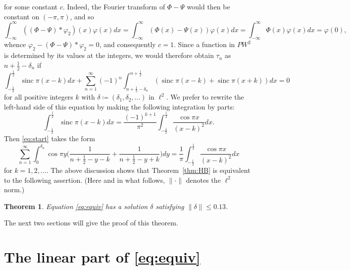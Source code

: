 \documentclass[12pt]{amsart}
\theoremstyle{plain}
\newtheorem{theorem}{Theorem}
\DeclareMathOperator{\sinc}{sinc}
\begin{document}
for some constant $c$. Indeed, the Fourier transform of $\Phi-\Psi$ would then be constant on $(-\pi,\pi)$, and so
\[ \int_{-\infty}^\infty ((\Phi-\Psi)\ast \varphi_2)(x)\varphi(x) dx=\int_{-\infty}^\infty (\Phi(x)-\Psi(x))\varphi(x) dx = \int_{-\infty}^\infty \Phi(x)\varphi(x) dx=\varphi(0),\] 
whence $\varphi_2 - (\Phi-\Psi)\ast \varphi_2=0$, and consequently $c=1$.
Since a function in $PW^2$ is determined by its values at the integers, we would therefore obtain $\tau_n$ as $n+\frac12-\delta_n$ if 
\begin{equation} \label{eq:start}  \int_{-\frac{1}{2}}^{\frac{1}{2}} \sinc \pi(x-k) dx + \sum_{n=1}^{\infty} (-1)^n \int_{n+\frac12-\delta_n}^{n+\frac{1}{2}} \left( \sinc \pi (x-k) + \sinc \pi (x+k)\right) dx=0 \end{equation}
for all positive integers $k$ with $\delta\coloneqq (\delta_1, \delta_2, \ldots )$ in $\ell^2$. We prefer to rewrite the left-hand side of this equation by 
making the following integration by parts:
\[ \int_{-\frac{1}{2}}^{\frac{1}{2}} \sinc \pi(x-k) dx = \frac{(-1)^{k+1}}{\pi^2} \int_{-\frac{1}{2}}^{\frac{1}{2}} \frac{\cos \pi x}{(x-k)^2} dx .\]
Then \eqref{eq:start} takes the form
\begin{equation} \label{eq:equiv}   \sum_{n=1}^{\infty} \int_0^{\delta_n} \cos \pi y \Big(\frac{1}{n+\frac{1}{2}-y-k}+\frac{1}{n+\frac{1}{2}-y+k}\Big)dy=\frac{1}{\pi}\int_{-\frac{1}{2}}^{\frac{1}{2}} \frac{\cos \pi x}{(x-k)^2} dx \end{equation}
for $k=1,2, \ldots$. The above discussion shows that Theorem~\ref{thm:HB} is equivalent to the following assertion. (Here and in what follows, $\|\cdot\|$ denotes the $\ell^2$ norm.)
\begin{theorem} \label{thm:eqHB} Equation \eqref{eq:equiv} has a solution $\delta$ satisfying $\| \delta\|\le 0.13$. \end{theorem}
 The next two sections will give the proof of this theorem.
 \section{The linear part \texorpdfstring{of \eqref{eq:equiv}}{}}
 
\end{document}

